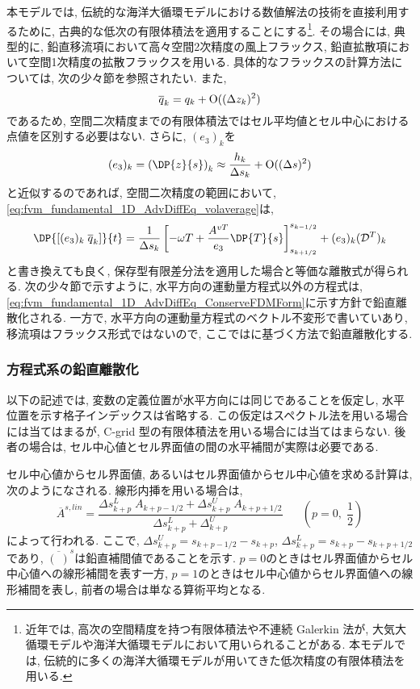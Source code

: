本モデルでは, 伝統的な海洋大循環モデルにおける数値解法の技術を直接利用するために, 
古典的な低次の有限体積法を適用することにする\footnote{
近年では, 高次の空間精度を持つ有限体積法や不連続 Galerkin 法が, 
大気大循環モデルや海洋大循環モデルにおいて用いられることがある. 
本モデルでは, 伝統的に多くの海洋大循環モデルが用いてきた低次精度の有限体積法を用いる. 
}.  
その場合には, 典型的に, 鉛直移流項において高々空間2次精度の風上フラックス, 
鉛直拡散項において空間1次精度の拡散フラックスを用いる. 
具体的なフラックスの計算方法については, 次の少々節を参照されたい.
また, 
$$
\overline{q}_k = q_k + {\rm O}( (\Delta z_k)^2 )
$$   
であるため, 空間二次精度までの有限体積法ではセル平均値とセル中心における点値を区別する必要はない. 
さらに, $(e_3)_k$を 
$$
 (e_3)_k = \left(\DP{z}{s}\right)_k 
 \approx \dfrac{h_k}{\Delta s_k} + {\rm O}( (\Delta s)^2 )
$$
と近似するのであれば, 空間二次精度の範囲において, \eqref{eq:fvm_fundamental_1D_AdvDiffEq_volaverage}は, 
\begin{align}
  \DP{[(e_3)_k \; \overline{q}_k]}{t}
  =
   \dfrac{1}{\Delta s_k} 
   \left[  - \omega T  + \dfrac{A^{vT}}{e_3} \DP{T}{s}
         \right]^{s_{k-1/2}}_{s_{k+1/2}} 
    + (e_3)_k (\mathcal{D}^T)_k
\label{eq:fvm_fundamental_1D_AdvDiffEq_ConserveFDMForm}
\end{align}
と書き換えても良く, 保存型有限差分法を適用した場合と等価な離散式が得られる. 
次の少々節で示すように, 水平方向の運動量方程式以外の方程式は, 
\eqref{eq:fvm_fundamental_1D_AdvDiffEq_ConserveFDMForm}に示す方針で鉛直離散化される. 
一方で, 水平方向の運動量方程式のベクトル不変形で書いていあり, 移流項はフラックス形式ではないので, 
ここでは\cite{arakawa1977computational}に基づく方法で鉛直離散化する.

\subsubsection*{方程式系の鉛直離散化}
以下の記述では, 変数の定義位置が水平方向には同じであることを仮定し, 
水平位置を示す格子インデックスは省略する. 
この仮定はスペクトル法を用いる場合には当てはまるが, 
C-grid 型の有限体積法を用いる場合には当てはまらない.  
後者の場合は, セル中心値とセル界面値の間の水平補間が実際は必要である. 

セル中心値からセル界面値, あるいはセル界面値からセル中心値を求める計算は, 
次のようになされる.  
線形内挿を用いる場合は, 
\begin{equation}
  \overline{A}^{s,lin}
  = \dfrac{  \Delta s_{k+p}^L \; A_{k+p-1/2} 
           + \Delta s_{k+p}^U \; A_{k+p+1/2}} 
          {\Delta s_{k+p}^L + \Delta_{k+p}^U} 
          \;\;\;\;\;\; (p=0, \; \dfrac{1}{2})
\label{eq:vertical_linear_interp} 
\end{equation}
によって行われる. 
ここで, 
$\Delta s_{k+p}^U = s_{k+p-1/2} - s_{k+p}$, 
$\Delta s_{k+p}^L = s_{k+p} - s_{k+p+1/2}$であり, 
$\overline{(\;)}^s$は鉛直補間値であることを示す.
$p=0$のときはセル界面値からセル中心値への線形補間を表す一方, 
$p=1$のときはセル中心値からセル界面値への線形補間を表し,   
前者の場合は単なる算術平均となる.   

